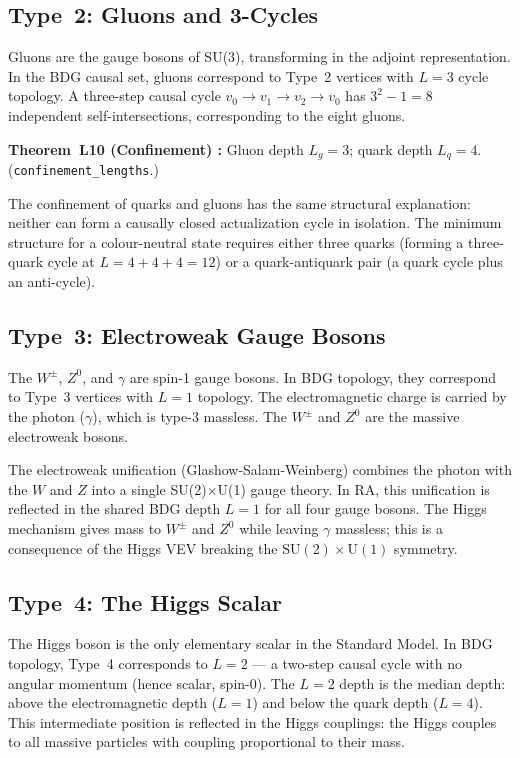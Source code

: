 \documentclass[12pt,a4paper]{article}
\begin{document}
\subsection{Type~2: Gluons and 3-Cycles}

Gluons are the gauge bosons of SU(3), transforming in the adjoint representation.  In the BDG causal set, gluons correspond to Type~2 vertices with $L=3$ cycle topology.  A three-step causal cycle $v_0\to v_1\to v_2\to v_0$ has $3^2-1=8$ independent self-intersections, corresponding to the eight gluons.

\begin{leanbox}
\textbf{Theorem~L10 (Confinement) \statusLV:} Gluon depth $L_g=3$; quark depth $L_q=4$.  (\texttt{confinement\_lengths}.)
\end{leanbox}

The confinement of quarks and gluons has the same structural explanation: neither can form a causally closed actualization cycle in isolation.  The minimum structure for a colour-neutral state requires either three quarks (forming a three-quark cycle at $L=4+4+4=12$) or a quark-antiquark pair (a quark cycle plus an anti-cycle).

\subsection{Type~3: Electroweak Gauge Bosons}

The $W^\pm$, $Z^0$, and $\gamma$ are spin-1 gauge bosons.  In BDG topology, they correspond to Type~3 vertices with $L=1$ topology.  The electromagnetic charge is carried by the photon ($\gamma$), which is type-3 massless.  The $W^\pm$ and $Z^0$ are the massive electroweak bosons.

The electroweak unification (Glashow-Salam-Weinberg) \cite{Weinberg1967} combines the photon with the $W$ and $Z$ into a single SU(2)$\times$U(1) gauge theory.  In RA, this unification is reflected in the shared BDG depth $L=1$ for all four gauge bosons.  The Higgs mechanism gives mass to $W^\pm$ and $Z^0$ while leaving $\gamma$ massless; this is a consequence of the Higgs VEV breaking the $\mathrm{SU}(2)\times\mathrm{U}(1)$ symmetry.

\subsection{Type~4: The Higgs Scalar}

The Higgs boson is the only elementary scalar in the Standard Model.  In BDG topology, Type~4 corresponds to $L=2$ --- a two-step causal cycle with no angular momentum (hence scalar, spin-0).  The $L=2$ depth is the median depth: above the electromagnetic depth ($L=1$) and below the quark depth ($L=4$).  This intermediate position is reflected in the Higgs couplings: the Higgs couples to all massive particles with coupling proportional to their mass.
\end{document}
